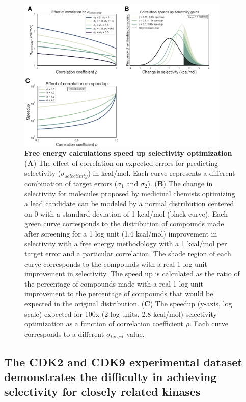 \documentclass[phd,tocprelim]{cornell}
\begin{document}
\begin{landscape}
\begin{figure}[p]
\centering
  \includegraphics[width=0.9\textwidth]{figures/figure1.png}
  \caption[Free energy calculations speed up selectivity optimization]{{\bf Free energy calculations speed up selectivity optimization} ({\bf A})  The effect of correlation on expected errors for predicting selectivity ($\sigma_{selectivity}$) in kcal/mol. Each curve represents a different combination of target errors ($\sigma_1$ and $\sigma_2$). ({\bf B}) The change in selectivity for molecules proposed by medicinal chemists optimizing a lead candidate can be modeled by a normal distribution centered on 0 with a standard deviation of 1 kcal/mol (black curve). Each green curve corresponds to the distribution of compounds made after screening for a 1 log unit (1.4 kcal/mol) improvement in selectivity with a free energy methodology with a 1 kcal/mol per target error and a particular correlation. The shade region of each curve corresponds to the compounds with a real 1 log unit  improvement in selectivity. The speed up is calculated as the ratio of the percentage of compounds made with a real 1 log unit improvement to the percentage of compounds that would be expected in the original distribution.  ({\bf C}) The speedup (y-axis, log scale) expected for 100x (2 log units, 2.8 kcal/mol) selectivity optimization as a function of correlation coefficient $\rho$. Each curve corresponds to a different $\sigma_{target}$ value.
  }
 \label{fig:figure-1}
\end{figure}
\end{landscape}

\subsection{The CDK2 and CDK9 experimental dataset demonstrates the difficulty in achieving selectivity for closely related kinases}
\end{document}
